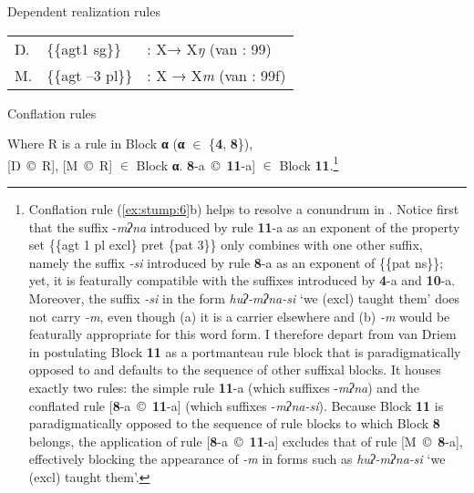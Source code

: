 \documentclass[output=paper,
modfonts
]{LSP/langsci}
\begin{document}
\ea Dependent realization rules %
    \label{ex:stump:5}
    
	\begin{tabular}{lll}
	 Ŋ. & \{\{agt\textsc{1} sg\}\}  & : X→ X\textit{ŋ}  (van \citealt{Driem1987}: 99)\\
	M. &  \{\{agt –3 pl\}\} &  : X → X\textit{m} (van \citealt{Driem1987}: 99f)
	\end{tabular}
\z
      
\ea Conflation rules %
    \label{ex:stump:6}
    \begin{xlist}
    \ex Where R is a rule in Block \textbf{α} (\textbf{α} ${\in}$ \{\textbf{4}, \textbf{8}\}), \\
    		{}[Ŋ~©~R],  [M~©~R]  ${\in}$ Block \textbf{α}.
     \ex  {[}\textbf{8}\nobreakdash-a~©~\textbf{11}\nobreakdash-a] ${\in}$ Block \textbf{11}.\footnote{Conflation rule (\ref{ex:stump:6}b) helps to resolve a conundrum in .  Notice first that the suffix -\textit{mʔna} introduced by rule \textbf{11}{}-a as an exponent of the property set \{\{agt 1 pl excl\} pret \{pat 3\}\} only combines with one other suffix, namely the suffix \textit{{}-si}  introduced by rule \textbf{8}{}-a as an exponent of \{\{pat\textsc{} ns\}\}; yet, it is featurally compatible with the suffixes introduced by \textbf{4}{}-a and \textbf{10}{}-a.  Moreover, the suffix \textit{{}-si} in the form \textit{huʔ\nobreakdash-mʔna\nobreakdash-si} ‘we (excl) taught them’ does not carry \textit{{}-m}, even though (a) it is a carrier elsewhere and (b) \textit{{}-m} would be featurally appropriate for this word form.  I therefore depart from van Driem in postulating Block \textbf{11} as a portmanteau rule block \citep[141]{Stump2001} that is paradigmatically opposed to and defaults to the sequence of other suffixal blocks.  It houses exactly two rules:  the simple rule \textbf{11}{}-a (which suffixes \nobreakdash-\textit{mʔna}) and the conflated rule [\textbf{8}\nobreakdash-a~©~\textbf{11}\nobreakdash-a] (which suffixes -\textit{mʔna-si}).  Because Block \textbf{11} is paradigmatically opposed to the sequence of rule blocks to which Block \textbf{8} belongs, the application of rule [\textbf{8}\nobreakdash-a~©~\textbf{11}\nobreakdash-a] excludes that of rule [M~©~\textbf{8}\nobreakdash-a], effectively blocking the appearance of \textit{{}-m} in forms such as \textit{huʔ\nobreakdash-mʔna\nobreakdash-si} ‘we (excl) taught them’.}
     \end{xlist}
\z
\end{document}
